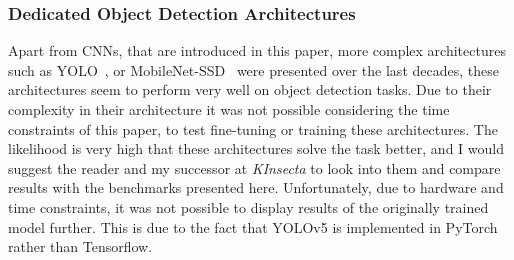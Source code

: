 \subsubsection{Dedicated Object Detection Architectures}
Apart from CNNs, that are introduced in this paper, more complex architectures such as YOLO~\cite{yolo}, or MobileNet-SSD~\cite{MobileNet} were presented over the last decades, these architectures seem to perform very well on object detection tasks.
Due to their complexity in their architecture it was not possible considering the time constraints of this paper, to test fine-tuning or training these architectures.
The likelihood is very high that these architectures solve the task better, and I would suggest the reader and my successor at \textit{KInsecta} to look into them and compare results with the benchmarks presented here.
Unfortunately, due to hardware and time constraints, it was not possible to display results of the originally trained model further. This is due to the fact that YOLOv5 is implemented in PyTorch rather than Tensorflow.
